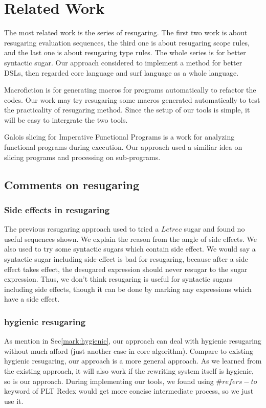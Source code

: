 \section{Related Work}


The most related work is the series of resugaring\cite{resugaring,hygienic,resugaringtype,resugaringscope}. The first two work is about resugaring evaluation sequences, the third one is about resugaring scope rules, and the last one is about resugaring type rules. The whole series is for better syntactic sugar. Our approach considered to implement a method for better DSLs, then regarded core language and surf language as a whole language.

Macrofiction\cite{Macrofication} is for generating macros for programs automatically to refactor the codes. Our work may try resugaring some macros generated automatically to test the practicality of resugaring method. Since the setup of our tools is simple, it will be easy to intergrate the two tools.

Galois slicing for Imperative Functional Programs\cite{slicing} is a work for analyzing functional programs during execution. Our approach used a similiar idea on slicing programs and processing on sub-programs.

\subsection{Comments on resugaring}

\subsubsection{Side effects in resugaring}The previous resugaring approach used to tried a $Letrec$ sugar and found no useful sequences shown. We explain the reason from the angle of side effects. We also used to try some syntactic sugars which contain side effect. We would say a syntactic sugar including side-effect is bad for resugaring, because after a side effect takes effect, the desugared expression should never resugar to the sugar expression. Thus, we don't think resugaring is useful for syntactic sugars  including side effects, though it can be done by marking any expressions which have a side effect.

\subsubsection{hygienic resugaring}As mention in Sec\ref{mark:hygienic}, our approach can deal with hygienic resugaring without much afford (just another case in core algorithm). Compare to existing hygienic resugaring\cite{hygienic}, our approach is a more general approach. As we learned from the existing approach, it will also work if the rewriting system itself is hygienic, so is our approach. During implementing our tools, we found using $\#refers-to$ keyword of PLT Redex would get more concise intermediate process, so we just use it.